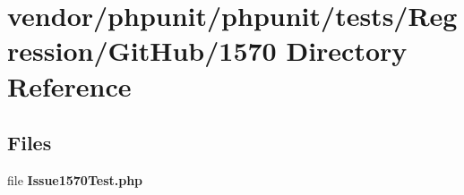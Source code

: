\section{vendor/phpunit/phpunit/tests/\+Regression/\+Git\+Hub/1570 Directory Reference}
\label{dir_07ced14d122456cbd1ac6606c3a9b9a4}
\subsection*{Files}
\begin{DoxyCompactItemize}
\item 
file {\bf Issue1570\+Test.\+php}
\end{DoxyCompactItemize}
